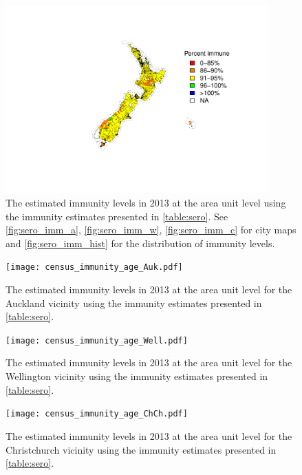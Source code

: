 \documentclass{article}
\begin{document}
\begin{figure}
     \begin{center}
     \includegraphics[width=0.9\textwidth]{census_immunity_age.pdf}
     \end{center}
     \caption{The estimated immunity levels in 2013 at the area unit level using the immunity estimates presented in \autoref{table:sero}. See \autoref{fig:sero_imm_a}, \autoref{fig:sero_imm_w}, \autoref{fig:sero_imm_c}  for city maps and \autoref{fig:sero_imm_hist} for the distribution of immunity levels.}
     \label{fig:sero_imm_map}
\end{figure}

\begin{figure}[H]
     \begin{center}
     \texttt{[image: census\_immunity\_age\_Auk.pdf]}
     \end{center}
     \caption{The estimated immunity levels in 2013 at the area unit level for the Auckland vicinity using the immunity estimates presented in \autoref{table:sero}.}
     \label{fig:sero_imm_a}
\end{figure}

\begin{figure}[H]
     \begin{center}
     \texttt{[image: census\_immunity\_age\_Well.pdf]}
     \end{center}
    \caption{The estimated immunity levels in 2013 at the area unit level for the Wellington vicinity using the immunity estimates presented in \autoref{table:sero}.}
     \label{fig:sero_imm_w}
\end{figure}

\begin{figure}[H]
     \begin{center}
     \texttt{[image: census\_immunity\_age\_ChCh.pdf]}
     \end{center}
    \caption{The estimated immunity levels in 2013 at the area unit level for the Christchurch vicinity using the immunity estimates presented in \autoref{table:sero}.}
     \label{fig:sero_imm_c}
\end{figure}
\end{document}
